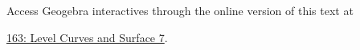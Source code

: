 \documentclass{ximera}
\begin{document}
\begin{example}  \label{E45hh6f45}

 
\begin{onlineOnly}
    \begin{center}
\end{center}
\end{onlineOnly}

Access Geogebra interactives through the online version of this text at
 
\href{https://www.geogebra.org/classic/ehscekb6}{163: Level Curves and Surface 7}.
\end{example}
\end{document}
